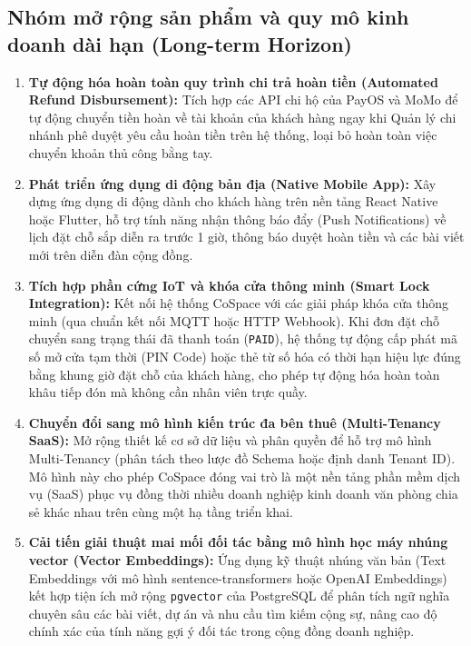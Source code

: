 \subsection{Nhóm mở rộng sản phẩm và quy mô kinh doanh dài hạn (Long-term Horizon)}
\begin{enumerate}
    \item \textbf{Tự động hóa hoàn toàn quy trình chi trả hoàn tiền (Automated Refund Disbursement):} Tích hợp các API chi hộ của PayOS và MoMo để tự động chuyển tiền hoàn về tài khoản của khách hàng ngay khi Quản lý chi nhánh phê duyệt yêu cầu hoàn tiền trên hệ thống, loại bỏ hoàn toàn việc chuyển khoản thủ công bằng tay.
    
    \item \textbf{Phát triển ứng dụng di động bản địa (Native Mobile App):} Xây dựng ứng dụng di động dành cho khách hàng trên nền tảng React Native hoặc Flutter, hỗ trợ tính năng nhận thông báo đẩy (Push Notifications) về lịch đặt chỗ sắp diễn ra trước 1 giờ, thông báo duyệt hoàn tiền và các bài viết mới trên diễn đàn cộng đồng.
    
    \item \textbf{Tích hợp phần cứng IoT và khóa cửa thông minh (Smart Lock Integration):} Kết nối hệ thống CoSpace với các giải pháp khóa cửa thông minh (qua chuẩn kết nối MQTT hoặc HTTP Webhook). Khi đơn đặt chỗ chuyển sang trạng thái đã thanh toán (\texttt{PAID}), hệ thống tự động cấp phát mã số mở cửa tạm thời (PIN Code) hoặc thẻ từ số hóa có thời hạn hiệu lực đúng bằng khung giờ đặt chỗ của khách hàng, cho phép tự động hóa hoàn toàn khâu tiếp đón mà không cần nhân viên trực quầy.
    
    \item \textbf{Chuyển đổi sang mô hình kiến trúc đa bên thuê (Multi-Tenancy SaaS):} Mở rộng thiết kế cơ sở dữ liệu và phân quyền để hỗ trợ mô hình Multi-Tenancy (phân tách theo lược đồ Schema hoặc định danh Tenant ID). Mô hình này cho phép CoSpace đóng vai trò là một nền tảng phần mềm dịch vụ (SaaS) phục vụ đồng thời nhiều doanh nghiệp kinh doanh văn phòng chia sẻ khác nhau trên cùng một hạ tầng triển khai.
    
    \item \textbf{Cải tiến giải thuật mai mối đối tác bằng mô hình học máy nhúng vector (Vector Embeddings):} Ứng dụng kỹ thuật nhúng văn bản (Text Embeddings với mô hình sentence-transformers hoặc OpenAI Embeddings) kết hợp tiện ích mở rộng \texttt{pgvector} của PostgreSQL để phân tích ngữ nghĩa chuyên sâu các bài viết, dự án và nhu cầu tìm kiếm cộng sự, nâng cao độ chính xác của tính năng gợi ý đối tác trong cộng đồng doanh nghiệp.
\end{enumerate}

